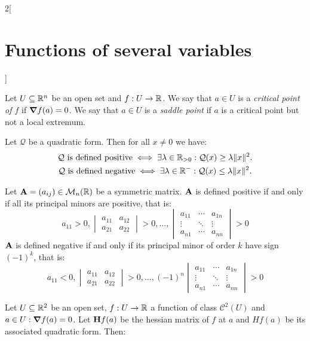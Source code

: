 \documentclass[../../../main.tex]{subfiles}
\begin{document}
\begin{multicols}{2}[\section{Functions of several variables}]
\begin{definition}
    Let $U\subseteq\mathbb{R}^n$ be an open set and $f:U\rightarrow\mathbb{R} $. We say that $a\in U$ is a \textit{critical point of $f$} if $\grad f(a)=0$. We say that $a\in U$ is a \textit{saddle point} if $a$ is a critical point but not a local extremum.
  \end{definition}
  \begin{theorem}
    Let $\mathcal{Q}$ be a quadratic form. Then for all $x\ne 0$ we have:
    \begin{gather*}
      \mathcal{Q}\text{ is defined positive}\iff\exists\lambda\in\mathbb{R}_{>0}:\mathcal{Q}(x)\geq\lambda\|x\|^2.\\
      \mathcal{Q}\text{ is defined negative}\iff\exists\lambda\in\mathbb{R}^-:\mathcal{Q}(x)\leq\lambda\|x\|^2.
    \end{gather*}
  \end{theorem}
  \begin{prop}
    Let $\boldsymbol{\mathrm{A}}=(a_{ij})\in\mathcal{M}_n(\mathbb{R} )$ be a symmetric matrix. $\boldsymbol{\mathrm{A}}$ is defined positive if and only if all its principal minors are positive, that is:
    $$a_{11}>0,
      \begin{vmatrix}
        a_{11} & a_{12} \\
        a_{21} & a_{22}\end{vmatrix}>0,\ldots,
      \begin{vmatrix}
        a_{11} & \cdots & a_{1n} \\
        \vdots & \ddots & \vdots \\
        a_{n1} & \cdots & a_{nn}
      \end{vmatrix}>0$$
    $\boldsymbol{\mathrm{A}}$ is defined negative if and only if its principal minor of order $k$ have sign $(-1)^k$, that is:
    $$a_{11}<0,
      \begin{vmatrix}
        a_{11} & a_{12} \\
        a_{21} & a_{22}
      \end{vmatrix}>0,\ldots,
      (-1)^n\begin{vmatrix}
        a_{11} & \cdots & a_{1n} \\
        \vdots & \ddots & \vdots \\
        a_{n1} & \cdots & a_{nn}
      \end{vmatrix}>0$$
  \end{prop}
  \begin{theorem}
    Let $U\subseteq\mathbb{R}^2$ be an open set, $f:U\rightarrow\mathbb{R} $ a function of class $\mathcal{C}^2(U)$ and $a\in U:\grad f(a)=0$. Let $\boldsymbol{\mathrm{H}}f(a)$ be the hessian matrix of $f$ at $a$ and $Hf(a)$ be its associated quadratic form. Then:

\end{theorem}
\end{multicols}
\end{document}

